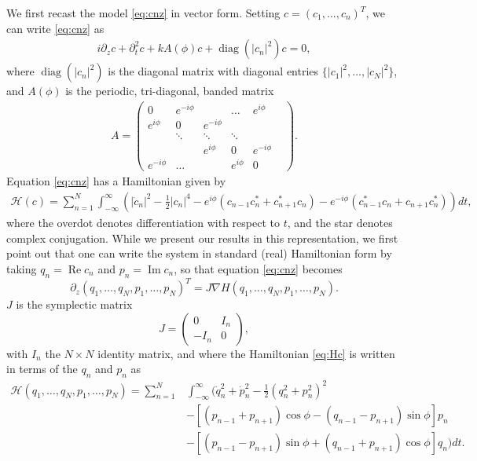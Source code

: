 \documentclass[11pt,reqno]{amsart}
\def\calH{{\mathcal H}}
\DeclareMathOperator{\diag}{diag}
\DeclareMathOperator{\RR}{Re}
\DeclareMathOperator{\II}{Im}
\begin{document}
We first recast the model \cref{eq:cnz} in vector form. Setting $c = (c_1, \dots, c_n)^T$, we can write \cref{eq:cnz} as
\begin{align}\label{eq:cz}
i \partial_z c + \partial_t^2 c + k A(\phi) c + \diag\left(|c_n|^2\right)c = 0,
\end{align}
where $\diag\left(|c_n|^2\right)$ is the diagonal matrix with diagonal entries $\{|c_1|^2, \dots, |c_N|^2\}$, and $A(\phi)$ is the periodic, tri-diagonal, banded matrix
\begin{align}
A = \begin{pmatrix}
0 & e^{-i \phi} & & \dots & e^{i \phi} \\
e^{i \phi} & 0 & e^{-i \phi} & & & \\
& \ddots & \ddots & \ddots &  & \\
 & &e^{i \phi}  & 0 & e^{-i \phi}  \\
e^{-i \phi}& \dots & & e^{i \phi} & 0
\end{pmatrix}.
\end{align}
Equation \cref{eq:cnz} has a Hamiltonian given by
\begin{align}\label{eq:Hc}
\calH(c) = \sum_{n=1}^N \int_{-\infty}^\infty 
\left(
|\dot{c}_n|^2 - \frac{1}{2}|c_n|^4 - e^{i\phi}( c_{n-1}c_n^* + c_{n+1}^* c_n) 
- e^{-i \phi}( c_{n-1}^*c_n + c_{n+1} c_n^*) \right) dt,
\end{align}
where the overdot denotes differentiation with respect to $t$, and the star denotes complex conjugation. While we present our results in this representation, we first point out that one can write the system in standard (real) Hamiltonian form by taking $q_n = \RR c_n$ and $p_n = \II c_n$, so that equation \cref{eq:cnz} becomes
\begin{equation}
\partial_z (q_1, \dots, q_N, p_1, \dots, p_N)^T
 = J \nabla H(q_1, \dots, q_N, p_1, \dots, p_N).
\end{equation}
$J$ is the symplectic matrix
\[
J = \begin{pmatrix}
0 & I_n \\ -I_n & 0
\end{pmatrix},
\]
with $I_n$ the $N \times N$ identity matrix, and where the Hamiltonian \cref{eq:Hc} is written in terms of the $q_n$ and $p_n$ as
\begin{equation}\label{eq:Hqp}
\begin{aligned}
\calH(q_1, \dots, q_N, p_1, \dots, p_N) = \sum_{n=1}^N &\int_{-\infty}^\infty 
\Big(
\dot{q}_n^2 + \dot{p}_n^2 - \frac{1}{2}(q_n^2 + p_n^2)^2 \\
&- \left[(p_{n-1} + p_{n+1}) \cos\phi - (q_{n-1} - p_{n+1}) \sin \phi\right] p_n \\
&- \left[(p_{n-1} - p_{n+1}) \sin\phi + (q_{n-1} + p_{n+1}) \cos \phi\right] q_n
\Big) dt.
\end{aligned}
\end{equation}
\end{document}
